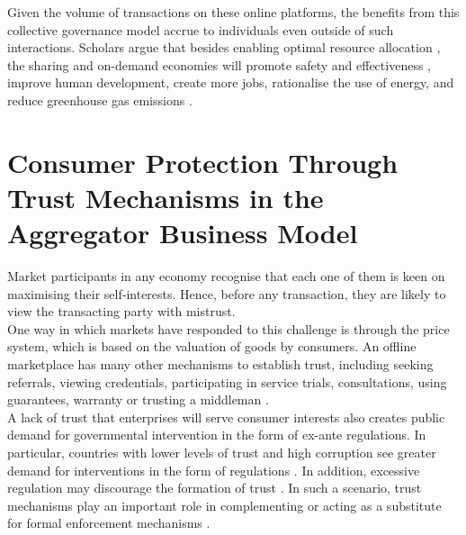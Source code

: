 \documentclass[a4paper, 12pt]{article}
\begin{document}
                  Given the volume of transactions on these online platforms, the benefits from this collective governance model accrue to individuals even outside of such interactions. Scholars argue that besides enabling optimal resource allocation \parencite{hamari2016sharing}, the sharing and on-demand economies will promote safety and effectiveness \parencite{feeney2015ridesharing}, improve human development, create more jobs, rationalise the use of energy, and reduce greenhouse gas emissions \parencite{wu2016impact}.

 
                    
                    \section{Consumer Protection Through Trust Mechanisms in the Aggregator Business Model}
                    
                    Market participants in any economy recognise that each one of them is keen on maximising their self-interests. Hence, before any transaction, they are likely to view the transacting party with mistrust.\\
                    
                    One way in which markets have responded to this challenge is through the price system, which is based on the valuation of goods by consumers. An offline marketplace has many other mechanisms to establish trust, including seeking referrals, viewing credentials, participating in service trials, consultations, using guarantees, warranty or trusting a middleman \parencite{thierer2015internet}.\\
                    
                  A lack of trust that enterprises will serve consumer interests also creates public demand for governmental intervention in the form of ex-ante regulations. In particular, countries with lower levels of trust and high corruption see greater demand for interventions in the form of regulations \parencite{aghionpaper}. In addition, excessive regulation may discourage the formation of trust \parencite{aghionpaper}. In such a scenario, trust mechanisms play an important role in complementing or acting as a substitute for formal enforcement mechanisms \parencite{thierer2015internet}. \\
                    
\end{document}

